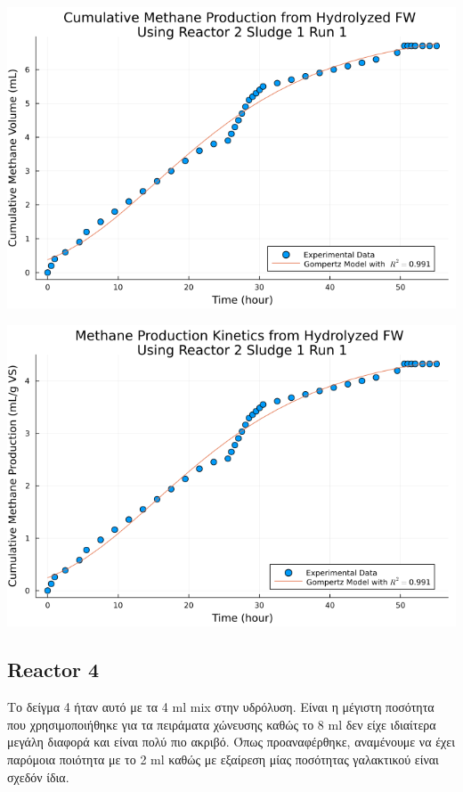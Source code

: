 \documentclass[11pt]{article}
\begin{document}
\begin{enumerate}
\begin{center}
\includegraphics[width=.9\linewidth]{../plots/BMPs/Hydrolyzed FW/methane_kinetics_hydrolysate_2_s1_r1_hour.png}
\end{center}

\begin{center}
\includegraphics[width=.9\linewidth]{../plots/BMPs/Hydrolyzed FW/specific_methane_kinetics_hydrolysate_2_s1_r1_hour.png}
\end{center}
\end{enumerate}

\subsection{Reactor 4}
\label{sec:org80ff4e1}
Το δείγμα 4 ήταν αυτό με τα 4 ml mix στην υδρόλυση. Είναι η μέγιστη ποσότητα που χρησιμοποιήθηκε για τα πειράματα χώνευσης καθώς το 8 ml δεν είχε ιδιαίτερα μεγάλη διαφορά και είναι πολύ πιο ακριβό. Όπως προαναφέρθηκε, αναμένουμε να έχει παρόμοια ποιότητα με το 2 ml καθώς με εξαίρεση μίας ποσότητας γαλακτικού είναι σχεδόν ίδια.
\end{document}
